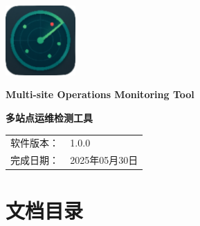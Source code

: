 \documentclass{article}
\begin{document}
\begin{titlepage}
\centering
\includegraphics[width=0.2\textwidth]{../assets/icon.png}

\vspace{2cm}

{\huge\bfseries Multi-site Operations Monitoring Tool \par}
\vspace{1cm}
{\huge\bfseries 多站点运维检测工具 \par}
\vspace{2cm}
{\large
\begin{tabular}{@{}r@{}l}
软件版本：\,& 1.0.0 \\
完成日期：\,& 2025年05月30日 \\
\end{tabular}
}
\end{titlepage}

\clearpage %
\section*{文档目录}
\end{document}
